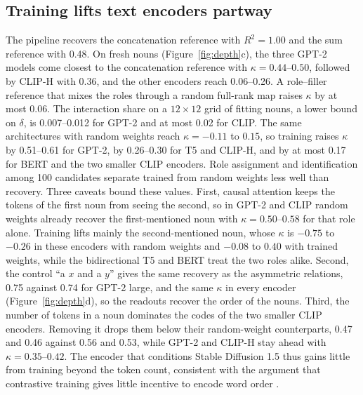\documentclass[10pt]{article}
\theoremstyle{plain}
\theoremstyle{remark}
\begin{document}
\subsection{Training lifts text encoders partway}
\label{sec:pretrained}

The pipeline recovers the concatenation reference with $R^2 = 1.00$ and the sum reference with 0.48. On fresh nouns (Figure~\ref{fig:depth}c), the three GPT-2 models come closest to the concatenation reference with $\kappa = 0.44$--$0.50$, followed by CLIP-H with 0.36, and the other encoders reach 0.06--0.26. A role--filler reference that mixes the roles through a random full-rank map raises $\kappa$ by at most 0.06. The interaction share on a $12 \times 12$ grid of fitting nouns, a lower bound on $\delta$, is 0.007--0.012 for GPT-2 and at most 0.02 for CLIP. The same architectures with random weights reach $\kappa = -0.11$ to $0.15$, so training raises $\kappa$ by 0.51--0.61 for GPT-2, by 0.26--0.30 for T5 and CLIP-H, and by at most 0.17 for BERT and the two smaller CLIP encoders. Role assignment and identification among 100 candidates separate trained from random weights less well than recovery. Three caveats bound these values. First, causal attention keeps the tokens of the first noun from seeing the second, so in GPT-2 and CLIP random weights already recover the first-mentioned noun with $\kappa = 0.50$--$0.58$ for that role alone. Training lifts mainly the second-mentioned noun, whose $\kappa$ is $-0.75$ to $-0.26$ in these encoders with random weights and $-0.08$ to $0.40$ with trained weights, while the bidirectional T5 and BERT treat the two roles alike. Second, the control ``a $x$ and a $y$'' gives the same recovery as the asymmetric relations, 0.75 against 0.74 for GPT-2 large, and the same $\kappa$ in every encoder (Figure~\ref{fig:depth}d), so the readouts recover the order of the nouns. Third, the number of tokens in a noun dominates the codes of the two smaller CLIP encoders. Removing it drops them below their random-weight counterparts, 0.47 and 0.46 against 0.56 and 0.53, while GPT-2 and CLIP-H stay ahead with $\kappa = 0.35$--$0.42$. The encoder that conditions Stable Diffusion 1.5 thus gains little from training beyond the token count, consistent with the argument that contrastive training gives little incentive to encode word order \citep{yuksekgonul2023}.
\end{document}
